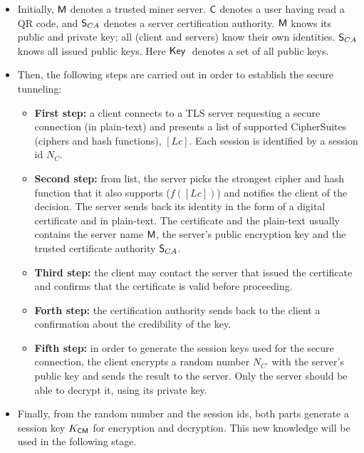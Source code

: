 \begin{itemize}
  \item Initially, $\textsf{M}$ denotes a trusted miner server. $\textsf{C}$ denotes
    a user having read a QR code, and $\textsf{S}_{CA}$ denotes a server certification 
    authority. $\textsf{M}$ knows its public and private key; all (client and servers) 
    know their own identities. $\textsf{S}_{CA}$ knows all issued
    public keys. Here $\textsf{Key}\;$ denotes a set of all public keys.
  \item Then, the following steps are carried out in order to
    establish the secure tunneling:
    \begin{itemize}
    \item \textbf{First step:} a client connects to a TLS server
      requesting a secure connection (in plain-text) and presents a list
      of supported CipherSuites (ciphers and hash functions),
      $[Lc]$. Each session is identified by a session id $N_{C}$. 
    \item \textbf{Second step:} from list, the server picks the
      strongest cipher and hash function that it also supports
      ($f([Lc])$) and notifies the client of the decision. The server
      sends back its identity in the form of a digital certificate and
      in plain-text. The certificate and the plain-text usually contains
      the server name $\textsf{M}$, the server's public encryption
      key and the trusted certificate authority $\textsf{S}_{CA}$. 
    \item \textbf{Third step:} the client may contact the
      server that issued the certificate and confirms that the
      certificate is valid before proceeding.
    \item \textbf{Forth step:} the certification authority sends back to the 
      client a confirmation about the credibility of the key.
    \item \textbf{Fifth step:} in order to generate the session keys used for the
      secure connection, the client encrypts a random number $N_{C'}$
      with the server's public key and sends the result to the
      server. Only the server should be able to decrypt it, using its
      private key.  
    \end{itemize}
\item Finally, from the random number
  and the session ids, both parts generate a
  session key $K_{\textsf{C}\textsf{M}}$ for encryption and decryption. This new
  knowledge will be used in the following stage.  
\end{itemize}


